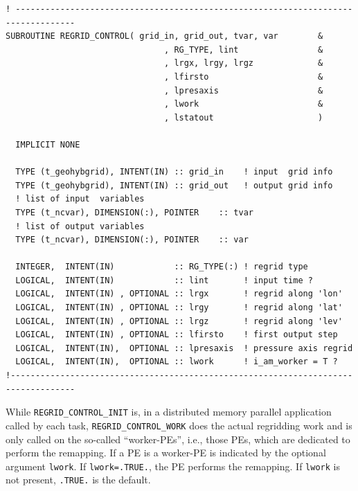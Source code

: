 \documentclass[11pt,twoside]{article}
\begin{document}
\begin{verbatim}
! ----------------------------------------------------------------------------------
SUBROUTINE REGRID_CONTROL( grid_in, grid_out, tvar, var        &
                                , RG_TYPE, lint                &
                                , lrgx, lrgy, lrgz             &
                                , lfirsto                      &
                                , lpresaxis                    & 
                                , lwork                        &
                                , lstatout                     )

  IMPLICIT NONE

  TYPE (t_geohybgrid), INTENT(IN) :: grid_in    ! input  grid info
  TYPE (t_geohybgrid), INTENT(IN) :: grid_out   ! output grid info
  ! list of input  variables
  TYPE (t_ncvar), DIMENSION(:), POINTER    :: tvar  
  ! list of output variables
  TYPE (t_ncvar), DIMENSION(:), POINTER    :: var   

  INTEGER,  INTENT(IN)            :: RG_TYPE(:) ! regrid type
  LOGICAL,  INTENT(IN)            :: lint       ! input time ?
  LOGICAL,  INTENT(IN) , OPTIONAL :: lrgx       ! regrid along 'lon'
  LOGICAL,  INTENT(IN) , OPTIONAL :: lrgy       ! regrid along 'lat'
  LOGICAL,  INTENT(IN) , OPTIONAL :: lrgz       ! regrid along 'lev'
  LOGICAL,  INTENT(IN) , OPTIONAL :: lfirsto    ! first output step
  LOGICAL,  INTENT(IN),  OPTIONAL :: lpresaxis  ! pressure axis regrid
  LOGICAL,  INTENT(IN),  OPTIONAL :: lwork      ! i_am_worker = T ?
!-----------------------------------------------------------------------------------
\end{verbatim}

While \verb|REGRID_CONTROL_INIT| is, in a distributed memory parallel
application called by  each task,
 \verb|REGRID_CONTROL_WORK| does the actual regridding work and
is only called on the so-called ``worker-PEs'', i.e., those PEs, which are 
dedicated to perform the remapping. If a PE is a worker-PE is indicated 
by the optional argument \verb|lwork|. If \verb|lwork=.TRUE.|, the PE
performs the remapping. If \verb|lwork| is not present, \verb|.TRUE.|
is the default.
\end{document}
